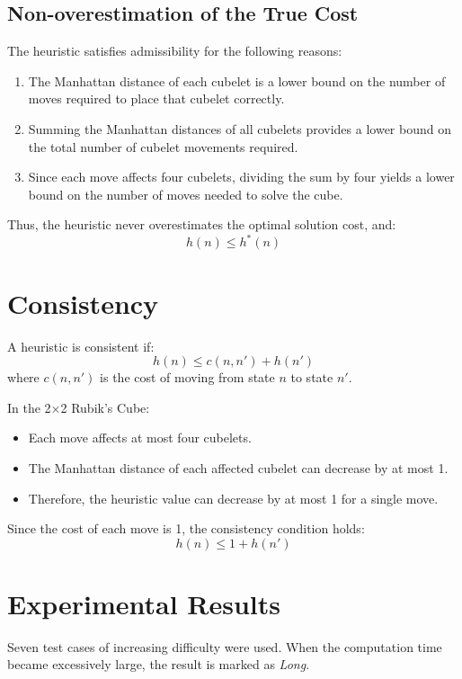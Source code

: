 \documentclass[12pt]{article}
\begin{document}
\subsection{Non-overestimation of the True Cost}
The heuristic satisfies admissibility for the following reasons:
\begin{enumerate}
    \item The Manhattan distance of each cubelet is a lower bound on the number of moves required to place that cubelet correctly.
    \item Summing the Manhattan distances of all cubelets provides a lower bound on the total number of cubelet movements required.
    \item Since each move affects four cubelets, dividing the sum by four yields a lower bound on the number of moves needed to solve the cube.
\end{enumerate}

Thus, the heuristic never overestimates the optimal solution cost, and:
\[
h(n) \leq h^*(n)
\]

\section{Consistency}
A heuristic is consistent if:
\[
h(n) \leq c(n, n') + h(n')
\]
where \( c(n, n') \) is the cost of moving from state \( n \) to state \( n' \).

In the 2×2 Rubik’s Cube:
\begin{itemize}
    \item Each move affects at most four cubelets.
    \item The Manhattan distance of each affected cubelet can decrease by at most 1.
    \item Therefore, the heuristic value can decrease by at most 1 for a single move.
\end{itemize}

Since the cost of each move is 1, the consistency condition holds:
\[
h(n) \leq 1 + h(n')
\]

\section{Experimental Results}
Seven test cases of increasing difficulty were used. When the computation time became excessively large, the result is marked as \textit{Long}.
\end{document}
